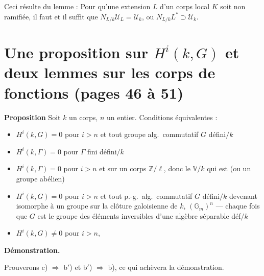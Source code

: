 \documentclass[11pt,a4paper]{article}
\begin{document}
Ceci résulte du lemme : Pour qu'une extension  $L$
\struck{\ill{}} d'un corps local \struck{\ill{}} $K$ soit non ramifiée, il
faut et il suffit que $N_{L/k}\mathcal{U}_{L} = \mathcal{U}_{k}$, ou
$N_{L/k} L^{*} \supset \mathcal{U}_{k}$.

\section*{Une proposition sur $H^{i}(k,G)$ et deux lemmes sur les corps de fonctions (pages 46 à 51)}

\textbf{Proposition} Soit $k$ un corps, $n$ un entier. Conditions
équivalentes :
\begin{itemize}
\item[a)] $H^{i}(k,G) = 0$ pour $i > n$ et tout groupe alg.\ commutatif $G$
défini$/k$
\item[b)] $H^{i}(k,\Gamma) = 0$ \struck{\ill{}} pour $\Gamma$ fini défini$/k$
\item[b$'$)] $H^{i}(k,\Gamma) = 0$ pour $i > n$ et   \ill{} \struck{\ill{}} sur un corps
$\mathbb{Z}/\ell$, donc le \ill{} $\mathbb{V}/k$ qui est (ou un groupe
abélien)  \ill{}
\item[c)] $H^{i}(k,G) = 0$ pour $i > n$ et tout p.-g.\ alg.\ commutatif $G$
défini$/k$ \struck{\ill{}} devenant isomorphe à un groupe \struck{\ill{}}
sur la clôture galoisienne de $k$, $(\mathbb{G}_{m})^{n}$ \ill{} ---
chaque fois que $G$ est le groupe des éléments inversibles d'une algèbre
 séparable \struck{\ill{}} déf$/k$
\item[c$'$)] $H^{i}(k,G) \ne 0$ pour $i > n$, \ill{}
\end{itemize}

\textbf{Démonstration.}


Prouverons c) $\Rightarrow$ b$'$) et b$'$) $\Rightarrow$ b), ce qui
achèvera la démonstration.
\end{document}
